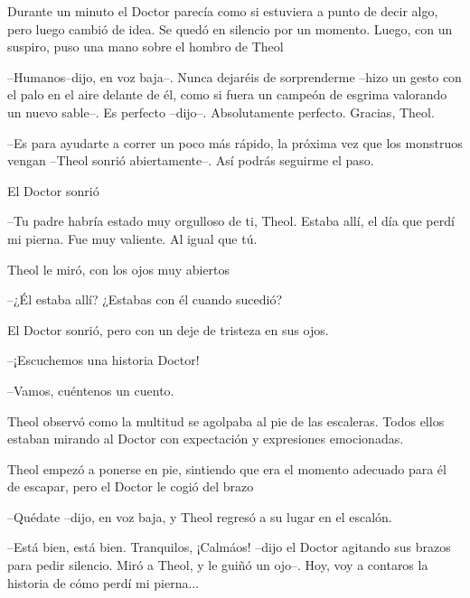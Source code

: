 Durante un minuto el Doctor parecía como si estuviera a punto de decir algo, pero luego cambió de idea. Se quedó en silencio por un momento. Luego, con un suspiro, puso una mano sobre el hombro de Theol 

--Humanos--dijo, en voz baja--. Nunca dejaréis de sorprenderme --hizo un gesto con el palo en el aire delante de él, como si fuera un campeón de esgrima valorando un nuevo sable--. Es perfecto --dijo--. Absolutamente perfecto. Gracias, Theol.



--Es para ayudarte a correr un poco más rápido, la próxima vez que los monstruos vengan --Theol sonrió abiertamente--. Así podrás seguirme el paso.



El Doctor sonrió 

--Tu padre habría estado muy orgulloso de ti, Theol. Estaba allí, el día que perdí mi pierna. Fue muy valiente. Al igual que tú.



Theol le miró, con los ojos muy abiertos 

--¿Él estaba allí? ¿Estabas con él cuando sucedió?



El Doctor sonrió, pero con un deje de tristeza en sus ojos.



--¡Escuchemos una historia Doctor!



--Vamos, cuéntenos un cuento.



Theol observó como la multitud se agolpaba al pie de las escaleras. Todos ellos estaban mirando al Doctor con expectación y expresiones emocionadas.



Theol empezó a ponerse en pie, sintiendo que era el momento adecuado para él de escapar, pero el Doctor le cogió del brazo 

--Quédate --dijo, en voz baja, y Theol regresó a su lugar en el escalón.



--Está bien, está bien. Tranquilos, ¡Calmáos! --dijo el Doctor agitando sus brazos para pedir silencio. Miró a Theol, y le guiñó un ojo--. Hoy, voy a contaros la historia de cómo perdí mi pierna...
